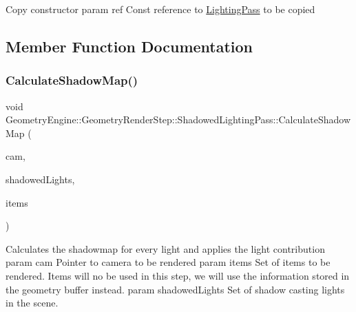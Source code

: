 Copy constructor param ref Const reference to \mbox{\hyperlink{class_geometry_engine_1_1_geometry_render_step_1_1_lighting_pass}{Lighting\+Pass}} to be copied 

\subsection{Member Function Documentation}
\mbox{\label{class_geometry_engine_1_1_geometry_render_step_1_1_shadowed_lighting_pass_a6365f5d2036ee96eae06074917f691f3}} 
\subsubsection{\texorpdfstring{CalculateShadowMap()}{CalculateShadowMap()}}
{\footnotesize\ttfamily void Geometry\+Engine\+::\+Geometry\+Render\+Step\+::\+Shadowed\+Lighting\+Pass\+::\+Calculate\+Shadow\+Map (\begin{DoxyParamCaption}\item[{\mbox{\hyperlink{class_geometry_engine_1_1_geometry_world_item_1_1_geometry_camera_1_1_camera}{Geometry\+World\+Item\+::\+Geometry\+Camera\+::\+Camera}} $\ast$}]{cam,  }\item[{std\+::unordered\+\_\+set$<$ \mbox{\hyperlink{class_geometry_engine_1_1_geometry_world_item_1_1_geometry_light_1_1_light}{Geometry\+World\+Item\+::\+Geometry\+Light\+::\+Light}} $\ast$ $>$ $\ast$}]{shadowed\+Lights,  }\item[{std\+::unordered\+\_\+set$<$ \mbox{\hyperlink{class_geometry_engine_1_1_geometry_world_item_1_1_geometry_item_1_1_geometry_item}{Geometry\+World\+Item\+::\+Geometry\+Item\+::\+Geometry\+Item}} $\ast$ $>$ $\ast$}]{items }\end{DoxyParamCaption})\hspace{0.3cm}{\ttfamily [protected]}}

Calculates the shadowmap for every light and applies the light contribution param cam Pointer to camera to be rendered param items Set of items to be rendered. Items will no be used in this step, we will use the information stored in the geometry buffer instead. param shadowed\+Lights Set of shadow casting lights in the scene. \mbox{\label{class_geometry_engine_1_1_geometry_render_step_1_1_shadowed_lighting_pass_a73176d6860aee0903034eeaf93edb40d}} 
